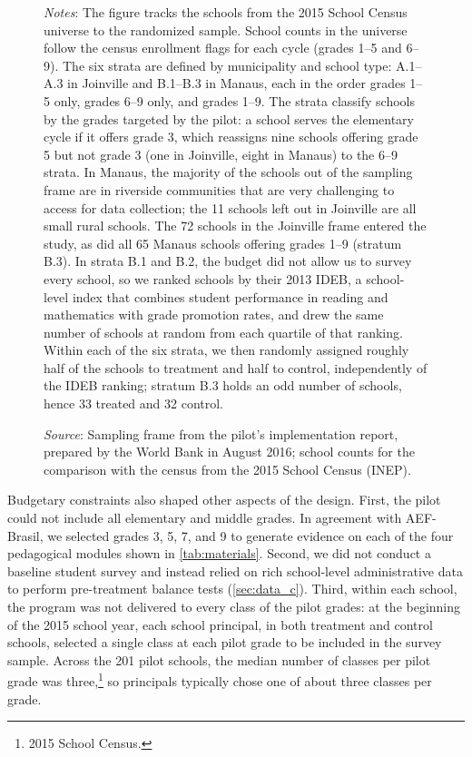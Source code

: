 \begin{figure}[h!]
\begin{minipage}{\textwidth}
\fontsize{9}{9}\selectfont
\textit{Notes}: The figure tracks the schools from the 2015 School Census universe to the randomized sample. School counts in the universe follow the census enrollment flags for each cycle (grades 1--5 and 6--9). The six strata are defined by municipality and school type: A.1--A.3 in Joinville and B.1--B.3 in Manaus, each in the order grades 1--5 only, grades 6--9 only, and grades 1--9. The strata classify schools by the grades targeted by the pilot: a school serves the elementary cycle if it offers grade 3, which reassigns nine schools offering grade 5 but not grade 3 (one in Joinville, eight in Manaus) to the 6--9 strata. In Manaus, the majority of the schools out of the sampling frame are in riverside communities that are very challenging to access for data collection; the 11 schools left out in Joinville are all small rural schools. The 72 schools in the Joinville frame entered the study, as did all 65 Manaus schools offering grades 1--9 (stratum B.3). In strata B.1 and B.2, the budget did not allow us to survey every school, so we ranked schools by their 2013 IDEB, a school-level index that combines student performance in reading and mathematics with grade promotion rates, and drew the same number of schools at random from each quartile of that ranking. Within each of the six strata, we then randomly assigned roughly half of the schools to treatment and half to control, independently of the IDEB ranking; stratum B.3 holds an odd number of schools, hence 33 treated and 32 control.

\textit{Source}: Sampling frame from the pilot's implementation report, prepared by the World Bank in August 2016; school counts for the comparison with the census from the 2015 School Census (INEP).
\end{minipage}
\end{figure}

Budgetary constraints also shaped other aspects of the design. First, the pilot could not include all elementary and middle grades. In agreement with AEF-Brasil, we selected grades 3, 5, 7, and 9 to generate evidence on each of the four pedagogical modules shown in \autoref{tab:materials}. Second, we did not conduct a baseline student survey and instead relied on rich school-level administrative data to perform pre-treatment balance tests (\autoref{sec:data_c}). Third, within each school, the program was not delivered to every class of the pilot grades: at the beginning of the 2015 school year, each school principal, in both treatment and control schools, selected a single class at each pilot grade to be included in the survey sample. Across the 201 pilot schools, the median number of classes per pilot grade was three,\footnote{2015 School Census.} so principals typically chose one of about three classes per grade.


